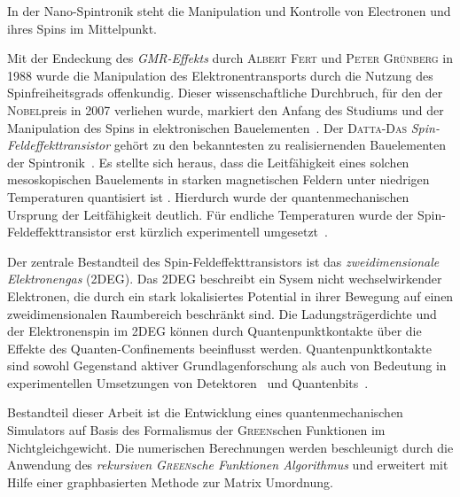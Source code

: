 In der Nano-Spintronik steht die Manipulation und Kontrolle von Electronen und ihres Spins im Mittelpunkt.\par
Mit der Endeckung des \emph{GMR-Effekts} durch \textsc{Albert Fert} und \textsc{Peter Gr\"unberg} in 1988 wurde die Manipulation des Elektronentransports durch die Nutzung des Spinfreiheitsgrads offenkundig. Dieser wissenschaftliche Durchbruch, f\"ur den der \textsc{Nobel}preis in 2007 verliehen wurde, markiert den Anfang des Studiums und der Manipulation des Spins in elektronischen Bauelementen~\cite{evegeny2010spin}. Der \textsc{Datta-Das} \emph{Spin-Feldeffekttransistor} geh\"ort zu den bekanntesten zu realisiernenden Bauelementen der Spintronik~\cite{datta:665}. Es stellte sich heraus, dass die Leitf\"ahigkeit eines solchen mesoskopischen Bauelements in starken magnetischen Feldern unter niedrigen Temperaturen quantisiert ist \cite{PhysRevLett.45.494}. Hierdurch wurde der quantenmechanischen Ursprung der Leitf\"ahigkeit deutlich. F\"ur endliche Temperaturen wurde der Spin-Feldeffekttransistor erst k\"urzlich experimentell umgesetzt~\cite{Wunderlich24122010}.\par
Der zentrale Bestandteil des Spin-Feldeffekttransistors ist das \emph{zweidimensionale Elektronengas} (2DEG). Das 2DEG beschreibt ein Sysem nicht wechselwirkender Elektronen, die durch ein stark lokalisiertes Potential in ihrer Bewegung auf einen zweidimensionalen Raumbereich beschr\"ankt sind. Die Ladungstr\"agerdichte und der Elektronenspin im 2DEG k\"onnen durch Quantenpunktkontakte \"uber die Effekte des Quanten-Confinements beeinflusst werden. Quantenpunktkontakte sind sowohl Gegenstand aktiver Grundlagenforschung als auch von Bedeutung in experimentellen Umsetzungen von Detektoren~\cite{PhysRevB.67.161308} und Quantenbits~\cite{PhysRevA.57.120}.\par
Bestandteil dieser Arbeit ist die Entwicklung eines quantenmechanischen Simulators auf Basis des Formalismus der \textsc{Green}schen Funktionen im Nichtgleichgewicht. Die numerischen Berechnungen werden beschleunigt durch die Anwendung des \emph{rekursiven \textsc{Green}sche Funktionen Algorithmus} und erweitert mit Hilfe einer graphbasierten Methode zur Matrix Umordnung. 
